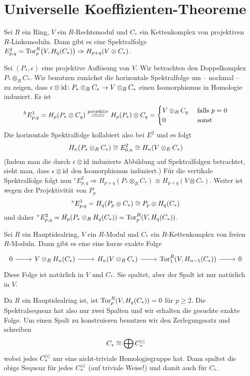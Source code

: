 \section{Universelle Koeffizienten-Theoreme} %
\label{sec:17}
\begin{satz}
	Sei $R$ ein Ring, $V$ ein $R$-Rechtsmodul und $C_*$ ein Kettenkomplex von projektiven $R$-Linksmoduln.
	Dann gibt es eine Spektralfolge $E^2_{p,q}= \Tor_p^R\enbrace[\big]{V, H_q(C_*)} \Rightarrow H_{p+q}(V \otimes C_*)$.
\end{satz}
\begin{beweis}
	Sei $(P_*, \epsilon)$ eine projektive Auflösung von $V$.
	Wir betrachten den Doppelkomplex $P_* \otimes_R C_*$.
	Wir benutzen zunächst die horizontale Spektralfolge um -- nochmal -- zu zeigen, dass $\epsilon \otimes \id \colon P_* \otimes_R C_* \to V \otimes_R C_*$ einen Isomorphismus in Homologie induziert.
	Es ist 
	\[
		^h E^1_{p,q} =H_p \enbrace*{P_* \otimes C_q} \StackText{projektiv}{=\joinrel=\joinrel=}H_p(P_*) \otimes C_q = \begin{cases}
			V \otimes_R C_q  &\text{ falls }p=0\\
			0 &\text{ sonst}
		\end{cases}
	\]
	Die horizontale Spektralfolge kollabiert also bei $E^2$ und es folgt 
	\[
		H_n \enbrace*{P_* \otimes_R C_*} \cong E_{0,n}^2 \cong H_n \enbrace*{V \otimes_E C_*}
	\]
	(Indem man die durch $\epsilon \otimes \id$ induzierte Abbildung auf Spektralfolgen betrachtet, sieht man, dass $\epsilon \otimes \id$ den Isomorphismus induziert.)
	Für die vertikale Spektralfolge folgt nun $^v E^2_{p,q} \Rightarrow H_{p+q}(P_* \otimes_R C_*) \cong H_{p+q}(V \otimes C_*)$.
	Weiter ist wegen der Projektivität von $P_p$
	\[
		^v E^1_{p,q} = H_q \enbrace*{P_p \otimes C_*} \cong P_p \otimes H_q(C_*)
	\]
	und daher $^v E^2_{p,q}=H_p \enbrace*{P_* \otimes_R H_q(C_*)}= \Tor_p^R \enbrace*{V, H_q(C_*)}$.
\end{beweis}

\begin{satz}[label=satz:hir_tensorprod_homologie]
	Sei $R$ ein Hauptidealring, $V$ ein $R$-Modul und $C_*$ ein $R$-Kettenkomplex von freien $R$-Moduln.
	Dann gibt es eine eine kurze exakte Folge
	\[
		\begin{tikzcd}
			0 \rar & V \otimes_R H_n(C_*) \rar & H_n(V \otimes_R C_*) \rar & \Tor_1^R \enbrace*{V, H_{n-1}(C_*)} \rar & 0
		\end{tikzcd}
	\]
	Diese Folge ist natürlich in $V$ und $C_*$.
	Sie spaltet, aber der Spalt ist nur natürlich in $V$.
\end{satz}
\begin{beweis}
	Da $R$ ein Hauptidealring ist, ist $\Tor^R_p \enbrace*{V, H_q(C_*)}=0$ für $p \ge 2$.
	Die Spektralsequenz hat also nur zwei Spalten und wir erhalten die gesuchte exakte Folge.
	Um einen Spalt zu konstruieren benutzen wir den Zerlegungssatz und schreiben 
	\[
		C_* \cong \bigoplus C_*^\ssbbrace{i}
	\]
	wobei jedes $C_*^\ssbbrace{i}$ nur eine nicht-triviale Homologiegruppe hat.
	Dann spaltet die obige Sequenz für jedes $C_*^\ssbbrace{i}$ (auf triviale Weise!) und damit auch für $C_*$.
\end{beweis}


